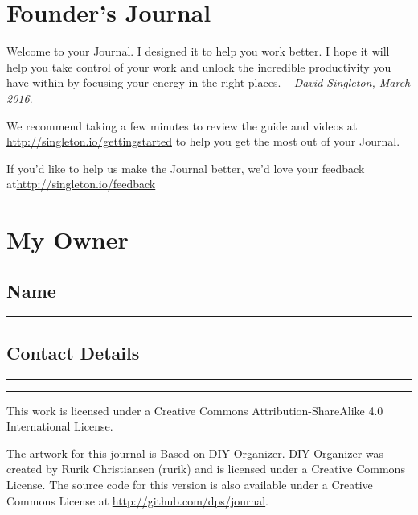 \section{Founder's Journal}

Welcome to your Journal.  I designed it to help you work better.  I hope it will help you take control of your work and unlock the incredible productivity you have within by focusing your energy in the right places.
-- \textit{David Singleton, March 2016}.
\par
We recommend taking a few minutes to review the guide and videos at \linebreak\url{http://singleton.io/gettingstarted} to help you get the most out of your Journal.
\par

If you'd like to help us make the Journal better, we'd love your feedback at\linebreak \url{http://singleton.io/feedback}


\section{My Owner}

\subsection{Name}
{\color{WriteBgMain}
\rule{\textwidth}{1pt}\par}

\subsection{Contact Details}
{\color{WriteBgMain}
\rule{\textwidth}{1pt}\par
\rule{\textwidth}{1pt}\par}

\pagebreak
This work is licensed under a Creative Commons Attribution-ShareAlike 4.0 International License.

The artwork for this journal is Based on DIY Organizer.  DIY Organizer was created by Rurik Christiansen (rurik) and is licensed under a Creative Commons License.  The source code for this version is also available under a Creative Commons License at \url{http://github.com/dps/journal}.

\pagebreak
